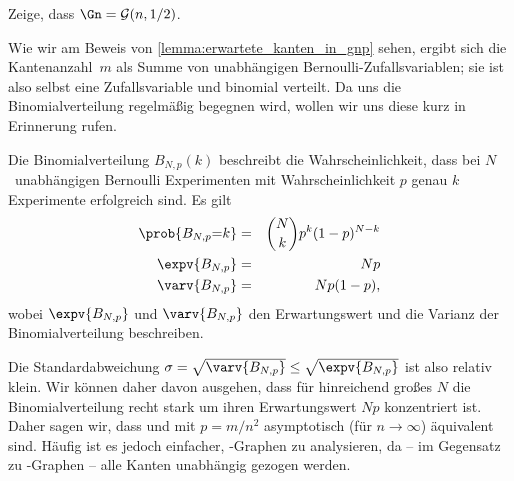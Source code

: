 \begin{exercise}
    Zeige, dass $\Gn = \mathcal G(n, 1/2)$.
\end{exercise}

\bigskip

Wie wir am Beweis von \cref{lemma:erwartete_kanten_in_gnp} sehen, ergibt sich die Kantenanzahl~$m$ als Summe von unabhängigen Bernoulli-Zufallsvariablen;
sie ist also selbst eine Zufallsvariable und binomial verteilt.
Da uns die Binomialverteilung regelmäßig begegnen wird, wollen wir uns diese kurz in Erinnerung rufen.
\begin{definition}
    Die  Binomialverteilung $B_{N, p}(k)$ beschreibt die Wahrscheinlichkeit, dass bei $N$~unabhängigen Bernoulli Experimenten mit Wahrscheinlichkeit $p$ genau $k$ Experimente erfolgreich sind.
    Es gilt 
    \begin{eqnarray*}
        \prob{B_{N,p} {=} k} &=& \binom{N}{k} p^k (1-p)^{N-k} \\
        \expv{B_{N,p}} &=& Np \\
        \varv{B_{N,p}} &=& Np(1-p),
    \end{eqnarray*}
    wobei $\expv{B_{N,p}}$ und $\varv{B_{N,p}}$ den Erwartungswert und die Varianz der Binomialverteilung beschreiben.
\end{definition}

Die Standardabweichung $\sigma = \sqrt{\varv{B_{N,p}}} \le \sqrt{\expv{B_{N,p}}}$ ist also relativ klein.
Wir können daher davon ausgehen, dass für hinreichend großes $N$ die Binomialverteilung recht stark um ihren Erwartungswert $Np$ konzentriert ist.
Daher sagen wir, dass \Gnm und \Gnp mit $p=m/n^2$ asymptotisch (\dh für $n \to \infty$) äquivalent sind.
Häufig ist es jedoch einfacher, \Gnp-Graphen zu analysieren, da -- im Gegensatz zu \Gnm-Graphen -- alle Kanten unabhängig gezogen werden.

